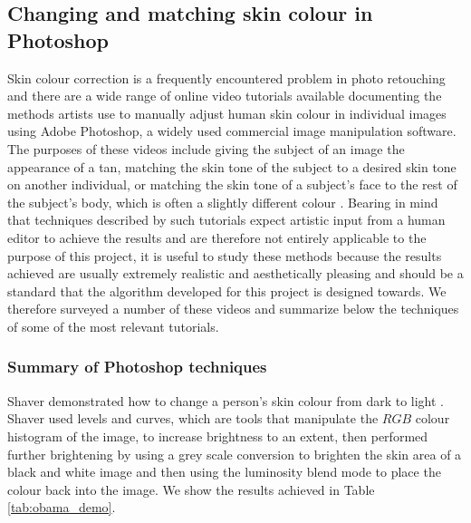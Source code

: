 \subsection{Changing and matching skin colour in Photoshop}

Skin colour correction is a frequently encountered problem in photo retouching and there are a wide range of online video tutorials available documenting the methods artists use to manually adjust human skin colour in individual images using Adobe Photoshop, a widely used commercial image manipulation software. The purposes of these videos include giving the subject of an image the appearance of a tan, matching the skin tone of the subject to a desired skin tone on another individual, or matching the skin tone of a subject's face to the rest of the subject's body, which is often a slightly different colour \cite{photoshop:tan, photoshop:match_other, photoshop:match_body}. Bearing in mind that techniques described by such tutorials expect artistic input from a human editor to achieve the results and are therefore not entirely applicable to the purpose of this project, it is useful to study these methods because the results achieved are usually extremely realistic and aesthetically pleasing and should be a standard that the algorithm developed for this project is designed towards. We therefore surveyed a number of these videos and summarize below the techniques of some of the most relevant tutorials.

\subsubsection*{Summary of Photoshop techniques}

Shaver demonstrated how to change a person's skin colour from dark to light \cite{photoshop:obama}. Shaver used levels and curves, which are tools that manipulate the $RGB$ colour histogram of the image, to increase brightness to an extent, then performed further brightening by using a grey scale conversion to brighten the skin area of a black and white image and then using the luminosity blend mode to place the colour back into the image. We show the results achieved in Table \ref{tab:obama_demo}.

